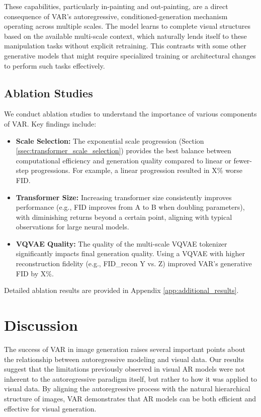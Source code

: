 \documentclass{article}
\begin{document}
These capabilities, particularly in-painting and out-painting, are a direct consequence of VAR's autoregressive, conditioned-generation mechanism operating across multiple scales. The model learns to complete visual structures based on the available multi-scale context, which naturally lends itself to these manipulation tasks without explicit retraining. This contrasts with some other generative models that might require specialized training or architectural changes to perform such tasks effectively.

\subsection{Ablation Studies}
\label{ssec:ablation}

We conduct ablation studies to understand the importance of various components of VAR. Key findings include:
\begin{itemize}[leftmargin=*,itemsep=1pt,topsep=2pt]
    \item \textbf{Scale Selection:} The exponential scale progression (Section \ref{ssec:transformer_scale_selection}) provides the best balance between computational efficiency and generation quality compared to linear or fewer-step progressions. For example, a linear progression resulted in X\% worse FID.
    \item \textbf{Transformer Size:} Increasing transformer size consistently improves performance (e.g., FID improves from A to B when doubling parameters), with diminishing returns beyond a certain point, aligning with typical observations for large neural models.
    \item \textbf{VQVAE Quality:} The quality of the multi-scale VQVAE tokenizer significantly impacts final generation quality. Using a VQVAE with higher reconstruction fidelity (e.g., FID_recon Y vs. Z) improved VAR's generative FID by X\%.
\end{itemize}
Detailed ablation results are provided in Appendix \ref{app:additional_results}.

\section{Discussion}
\label{sec:discussion}

The success of VAR in image generation raises several important points about the relationship between autoregressive modeling and visual data. Our results suggest that the limitations previously observed in visual AR models were not inherent to the autoregressive paradigm itself, but rather to how it was applied to visual data. By aligning the autoregressive process with the natural hierarchical structure of images, VAR demonstrates that AR models can be both efficient and effective for visual generation.
\end{document}
